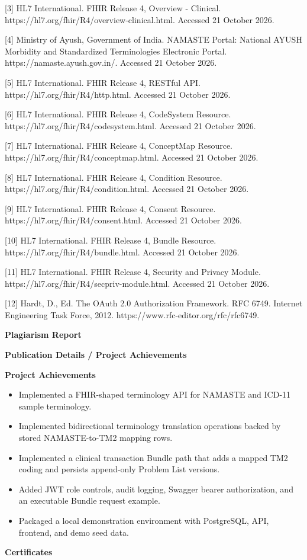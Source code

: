\documentclass[12pt,a4paper,oneside]{report}
\begin{document}
[3] HL7 International. FHIR Release 4, Overview - Clinical. https://hl7.org/fhir/R4/overview-clinical.html. Accessed 21 October 2026.

[4] Ministry of Ayush, Government of India. NAMASTE Portal: National AYUSH Morbidity and Standardized Terminologies Electronic Portal. https://namaste.ayush.gov.in/. Accessed 21 October 2026.

[5] HL7 International. FHIR Release 4, RESTful API. https://hl7.org/fhir/R4/http.html. Accessed 21 October 2026.

[6] HL7 International. FHIR Release 4, CodeSystem Resource. https://hl7.org/fhir/R4/codesystem.html. Accessed 21 October 2026.

[7] HL7 International. FHIR Release 4, ConceptMap Resource. https://hl7.org/fhir/R4/conceptmap.html. Accessed 21 October 2026.

[8] HL7 International. FHIR Release 4, Condition Resource. https://hl7.org/fhir/R4/condition.html. Accessed 21 October 2026.

[9] HL7 International. FHIR Release 4, Consent Resource. https://hl7.org/fhir/R4/consent.html. Accessed 21 October 2026.

[10] HL7 International. FHIR Release 4, Bundle Resource. https://hl7.org/fhir/R4/bundle.html. Accessed 21 October 2026.

[11] HL7 International. FHIR Release 4, Security and Privacy Module. https://hl7.org/fhir/R4/secpriv-module.html. Accessed 21 October 2026.

[12] Hardt, D., Ed. The OAuth 2.0 Authorization Framework. RFC 6749. Internet Engineering Task Force, 2012. https://www.rfc-editor.org/rfc/rfc6749.

\clearpage
\clearpage\begin{center}\Large\textbf{\textbf{Plagiarism Report}}\end{center}
\clearpage
\clearpage\begin{center}\Large\textbf{\textbf{Publication Details / Project Achievements}}\end{center}
\textbf{Project Achievements}

\begin{itemize}
\item Implemented a FHIR-shaped terminology API for NAMASTE and ICD-11 sample terminology.
\item Implemented bidirectional terminology translation operations backed by stored NAMASTE-to-TM2 mapping rows.
\item Implemented a clinical transaction Bundle path that adds a mapped TM2 coding and persists append-only Problem List versions.
\item Added JWT role controls, audit logging, Swagger bearer authorization, and an executable Bundle request example.
\item Packaged a local demonstration environment with PostgreSQL, API, frontend, and demo seed data.
\end{itemize}
\clearpage
\clearpage\begin{center}\Large\textbf{\textbf{Certificates}}\end{center}
\end{document}
